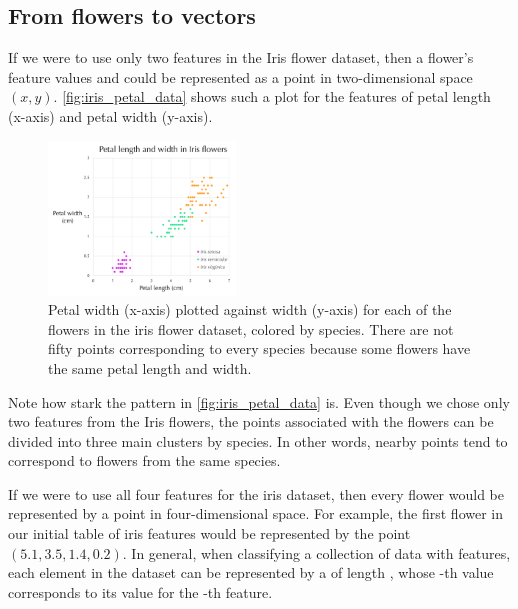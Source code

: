 \begin{qbox}\end{qbox}

\FloatBarrier
{}
\subsection{From flowers to vectors}

If we were to use only two features in the Iris flower dataset, then a flower's feature values  and  could be represented as a point in two-dimensional space $(x, y)$. \autoref{fig:iris_petal_data} shows such a plot for the features of petal length (x-axis) and petal width (y-axis).

\begin{figure}[h]
\centering
\mySfFamily
\includegraphics[width = 0.444\textwidth]{../images/iris_petal_data.png}
\caption{Petal width (x-axis) plotted against width (y-axis) for each of the flowers in the iris flower dataset, colored by species. There are not fifty points corresponding to every species because some flowers have the same petal length and width.}
\label{fig:iris_petal_data}
\end{figure}

Note how stark the pattern in \autoref{fig:iris_petal_data} is. Even though we chose only two features from the Iris flowers, the points associated with the flowers can be divided into three main clusters by species. In other words, nearby points tend to correspond to flowers from the same species.

If we were to use all four features for the iris dataset, then every flower would be represented by a point in four-dimensional space. For example, the first flower in our initial table of iris features would be represented by the point $(5.1, 3.5, 1.4, 0.2)$. In general, when classifying a collection of data with  features, each element in the dataset can be represented by a  of length , whose -th value corresponds to its value for the -th feature.

